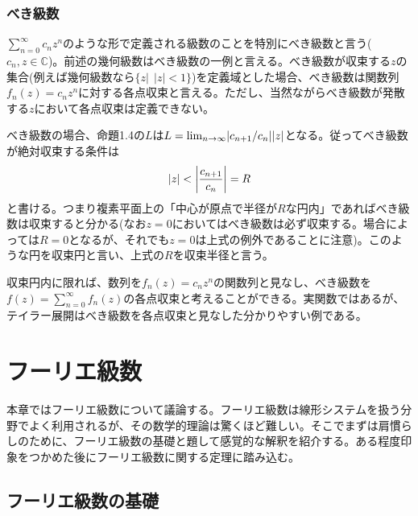 \documentclass[dvipdfmx, 9pt, a4paper]{jsarticle}
\begin{document}
\subsubsection{べき級数}
$\sum_{n=0}^\infty c_nz^n$のような形で定義される級数のことを特別にべき級数と言う($c_n, z \in \mathbb{C}$)。前述の幾何級数はべき級数の一例と言える。べき級数が収束する$z$の集合(例えば幾何級数なら$\{z |~~|z| < 1\}$)を定義域とした場合、べき級数は関数列$f_n(z)=c_nz^n$に対する各点収束と言える。ただし、当然ながらべき級数が発散する$z$において各点収束は定義できない。\par
べき級数の場合、命題1.4の$L$は$L={\rm lim}_{n \to \infty}|c_{n+1}/c_n||z|$となる。従ってべき級数が絶対収束する条件は
\begin{equation}
|z| < \left|\frac{c_{n+1}}{c_n}\right|=R \notag
\end{equation}
と書ける。つまり複素平面上の「中心が原点で半径が$R$な円内」であればべき級数は収束すると分かる(なお$z=0$においてはべき級数は必ず収束する。場合によっては$R=0$となるが、それでも$z=0$は上式の例外であることに注意)。このような円を収束円と言い、上式の$R$を収束半径と言う。\par
収束円内に限れば、数列を$f_n(z)=c_nz^n$の関数列と見なし、べき級数を$f(z)=\sum_{n=0}^\infty f_n(z)$の各点収束と考えることができる。実関数ではあるが、テイラー展開はべき級数を各点収束と見なした分かりやすい例である。

\section{フーリエ級数}
本章ではフーリエ級数について議論する。フーリエ級数は線形システムを扱う分野でよく利用されるが、その数学的理論は驚くほど難しい。そこでまずは肩慣らしのために、フーリエ級数の基礎と題して感覚的な解釈を紹介する。ある程度印象をつかめた後にフーリエ級数に関する定理に踏み込む。
\subsection{フーリエ級数の基礎}
\end{document}
